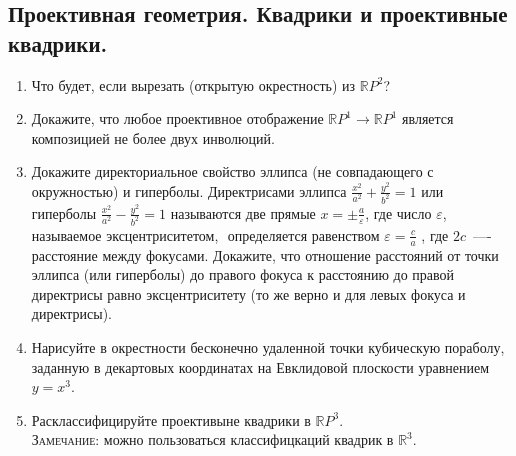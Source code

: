 \documentclass[11pt]{article}
\begin{document}
    \subsection{Проективная геометрия. Квадрики и проективные квадрики.}
    \begin{enumerate}
        \item Что будет, если вырезать (открытую окрестность) из $\mathbb{R}P^2$?

        \item Докажите, что любое проективное отображение $\mathbb{R}P^1 \to \mathbb{R}P^1$ является композицией не более двух инволюций.

        \item Докажите директориальное свойство эллипса (не совпадающего с  окружностью) и гиперболы. Директрисами эллипса $\frac{x^2}{a^2} + \frac{y^2}{b^2} = 1$ или гиперболы  $\frac{x^2}{a^2} - \frac{y^2}{b^2} = 1$ называются две прямые $x = \pm\frac{a}{\varepsilon}$, где число $\varepsilon$, называемое эксцентриситетом,  определяется равенством $\varepsilon = \frac{c}{a}$ , где $2c$~—- расстояние между фокусами. Докажите, что отношение расстояний от точки эллипса (или гиперболы) до правого фокуса к расстоянию до правой директрисы равно эксцентриситету (то же верно и для левых фокуса и директрисы).

        \item Нарисуйте в окрестности бесконечно удаленной точки кубическую пораболу, заданную в декартовых координатах на Евклидовой плоскости
              уравнением $y = x^3$.

        \item Расклассифицируйте проективыне квадрики в $\mathbb{R}P^3$. \\
              \textsc{Замечание:} можно пользоваться классифицкаций квадрик в $\mathbb{R}^3$.
    \end{enumerate}
\end{document}
